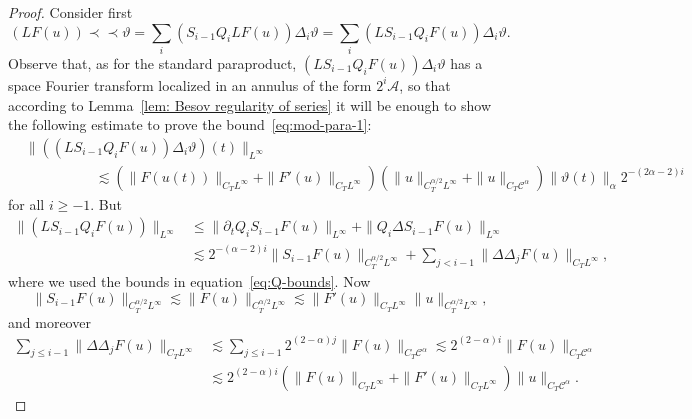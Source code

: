 \documentclass[11pt,a4paper]{article}
\newcommand{\precprec}{\prec\!\!\!\prec}
\theoremstyle{remark}
\newcommand{\R}{\mathbb{R}}
\newcommand{\CA}{\ensuremath{\mathscr{A}}}
\newcommand{\CC}{\ensuremath{\mathscr{C}}}
\begin{document}
\begin{proof}
  Consider first
  \[
     ( L F ( u ) ) \precprec \vartheta = \sum_{i} ( S_{i-1} Q_{i} L F ( u )  )  \Delta_{i} \vartheta = \sum_{i} ( L S_{i-1} Q_{i}  F ( u )  ) \Delta_{i} \vartheta.
  \]
  Observe that, as for the standard paraproduct, $( L S_{i-1} Q_{i}  F ( u )) \Delta_{i} \vartheta$ has a space Fourier transform localized in an
  annulus of the form $2^{i} \CA$, so that according to Lemma~\ref{lem: Besov regularity of series} it will be enough to show the following estimate to
  prove the bound~{\eqref{eq:mod-para-1}}:
  \begin{align*}
     &\| ( ( L S_{i-1} Q_{i}  F ( u ) ) \Delta_{i} \vartheta ) ( t ) \|_{L^{\infty}} \\
     &\hspace{60pt} \lesssim ( \| F ( u ( t ) ) \|_{C_{T} L^{\infty}} + \| F' ( u ) \|_{C_{T}  L^{\infty}} ) ( \| u \|_{C_{T}^{\alpha /2} L^{\infty}} + \| u \|_{C_{T} \CC^\alpha} ) \| \vartheta ( t ) \|_{\alpha} 2^{- ( 2 \alpha -2 ) i}
  \end{align*}
  for all $i \geqslant -1$. But
  \begin{align*}
     \| ( L S_{i-1} Q_{i}  F ( u ) ) \|_{L^{\infty}} & \leqslant \| \partial_{t} Q_{i} S_{i-1}  F ( u )  \|_{L^{\infty}} + \| Q_{i} \Delta  S_{i-1}  F ( u )  \|_{L^{\infty}} \\
     & \lesssim 2^{- ( \alpha -2 ) i} \| S_{i-1}  F ( u )  \|_{C_{T}^{\alpha /2} L^{\infty}} + \sum_{j<i-1} \| \Delta \Delta_{j}  F ( u )  \|_{C_{T} L^{\infty}},
  \end{align*}
  where we used the bounds in equation~{\eqref{eq:Q-bounds}}. Now
  \[
     \| S_{i-1}  F ( u )  \|_{C_{T}^{\alpha /2} L^{\infty}} \lesssim \| F ( u )  \|_{C_{T}^{\alpha /2} L^{\infty}} \lesssim \| F' ( u ) \|_{C_{T} L^{\infty}} \| u \|_{C_{T}^{\alpha /2} L^{\infty}},
  \]
  and moreover
  \begin{align*}
     \sum_{j \leqslant i-1} \| \Delta \Delta_{j}  F ( u )  \|_{C_{T} L^{\infty}} & \lesssim \sum_{j \leqslant i-1} 2^{( 2- \alpha ) j} \| F ( u ) \|_{C_{T} \CC^\alpha} \lesssim 2^{( 2- \alpha ) i} \| F ( u ) \|_{C_{T} \CC^\alpha} \\
     & \lesssim 2^{( 2- \alpha ) i} ( \| F ( u ) \|_{C_{T} L^{\infty}} + \| F' ( u ) \|_{C_{T} L^{\infty}} ) \| u \|_{C_{T} \CC^\alpha}.
  \end{align*}

\end{proof}
\end{document}

